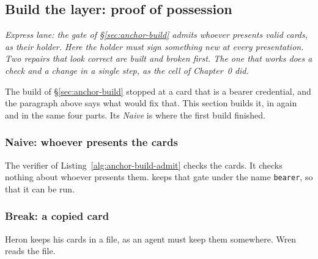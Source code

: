 %
%
\subsection{Build the layer: proof of possession}
\label{sec:anchor-build-holder}

\noindent\emph{Express lane: the gate of \S\ref{sec:anchor-build} admits
whoever presents valid cards, as their holder. Here the holder must sign
something new at every presentation. Two repairs that look correct are built
and broken first. The one that works does a check and a change in a single
step, as the cell of Chapter~0 did.}

The build of \S\ref{sec:anchor-build} stopped at a card that is a bearer
credential, and the paragraph above says what would fix that. This section
builds it, in \pdkernelname{} again and in the same four parts. Its
\emph{Naive} is where the first build finished.

\subsubsection{Naive: whoever presents the cards}

The verifier of Listing~\ref{alg:anchor-build-admit} checks the cards. It
checks nothing about whoever presents them. \pdkernelname{} keeps that gate
under the name \texttt{bearer}, so that it can be run.

\subsubsection{Break: a copied card}

Heron keeps his cards in a file, as an agent must keep them somewhere. Wren
reads the file.


